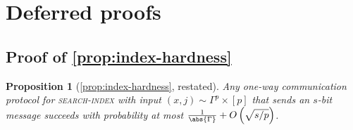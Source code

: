 \documentclass[a4paper,UKenglish,cleveref, autoref, thm-restate]{lipics-v2021}
\newtheorem{proposition}[theorem]{Proposition}
\theoremstyle{definition}
\newcommand{\searchindex}{\normalfont\textsc{search-index}\xspace}
\newcommand{\pcommitlength}{p}
\newcommand{\alphabet}{\Gamma}
\begin{document}
\iflipics

\else

\fi


\appendix

\section{Deferred proofs}
\label{sec:deferred-proofs}

\subsection{Proof of \texorpdfstring{\cref{prop:index-hardness}}{Theorem \ref{prop:index-hardness}}}
\label{sec:deferred-index-hardness}
\begin{proposition}[\cref{prop:index-hardness}, restated]
    Any one-way communication protocol for \searchindex with input $(x, j) \sim \alphabet^\pcommitlength \times [\pcommitlength]$ that sends an $s$-bit message succeeds with probability at most $\frac1{\abs{\alphabet}}+O\left(\sqrt{s/\pcommitlength}\right)$.
\end{proposition}
\end{document}
